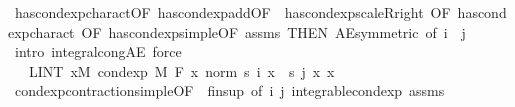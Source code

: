 \begin{isabellebody}
\ has{\isacharunderscore}{\kern0pt}cond{\isacharunderscore}{\kern0pt}exp{\isacharunderscore}{\kern0pt}charact{\isacharparenleft}{\kern0pt}{}{\isacharparenright}{\kern0pt}{\isacharbrackleft}{\kern0pt}OF\ has{\isacharunderscore}{\kern0pt}cond{\isacharunderscore}{\kern0pt}exp{\isacharunderscore}{\kern0pt}add{\isacharbrackleft}{\kern0pt}OF\ {\isacharunderscore}{\kern0pt}\ has{\isacharunderscore}{\kern0pt}cond{\isacharunderscore}{\kern0pt}exp{\isacharunderscore}{\kern0pt}scaleR{\isacharunderscore}{\kern0pt}right{\isacharcomma}{\kern0pt}\ OF\ has{\isacharunderscore}{\kern0pt}cond{\isacharunderscore}{\kern0pt}exp{\isacharunderscore}{\kern0pt}charact{\isacharparenleft}{\kern0pt}{}{\isacharcomma}{\kern0pt}{}{\isacharparenright}{\kern0pt}{\isacharcomma}{\kern0pt}\ OF\ has{\isacharunderscore}{\kern0pt}cond{\isacharunderscore}{\kern0pt}exp{\isacharunderscore}{\kern0pt}simple{\isacharparenleft}{\kern0pt}{}{\isacharcomma}{\kern0pt}{}{\isacharparenright}{\kern0pt}{\isacharbrackleft}{\kern0pt}OF\ assms{\isacharparenleft}{\kern0pt}{}{\isacharcomma}{\kern0pt}{}{\isacharparenright}{\kern0pt}{\isacharbrackright}{\kern0pt}{\isacharbrackright}{\kern0pt}{\isacharcomma}{\kern0pt}\ THEN\ AE{\isacharunderscore}{\kern0pt}symmetric{\isacharcomma}{\kern0pt}\ of\ i\ {\isachardoublequoteopen}{\isacharminus}{\kern0pt}{}{\isachardoublequoteclose}\ j{\isacharbrackright}{\kern0pt}\ \isamarkupfalse%
\ {\isacharparenleft}{\kern0pt}intro\ integral{\isacharunderscore}{\kern0pt}cong{\isacharunderscore}{\kern0pt}AE{\isacharparenright}{\kern0pt}\ force{\isacharplus}{\kern0pt}\ \ \ \ \ \ \isanewline
\ \ \ \ \ \ \isamarkupfalse%
\ \isamarkupfalse%
\ {\isachardoublequoteopen}{\isachardot}{\kern0pt}{\isachardot}{\kern0pt}{\isachardot}{\kern0pt}\ {\isasymle}\ LINT\ x{\isacharbar}{\kern0pt}M{\isachardot}{\kern0pt}\ cond{\isacharunderscore}{\kern0pt}exp\ M\ F\ {\isacharparenleft}{\kern0pt}{\isasymlambda}x{\isachardot}{\kern0pt}\ norm\ {\isacharparenleft}{\kern0pt}s\ i\ x\ {\isacharminus}{\kern0pt}\ s\ j\ x{\isacharparenright}{\kern0pt}{\isacharparenright}{\kern0pt}\ x{\isachardoublequoteclose}\ \isamarkupfalse%
\ cond{\isacharunderscore}{\kern0pt}exp{\isacharunderscore}{\kern0pt}contraction{\isacharunderscore}{\kern0pt}simple{\isacharbrackleft}{\kern0pt}OF\ {\isacharunderscore}{\kern0pt}\ fin{\isacharunderscore}{\kern0pt}sup{\isacharcomma}{\kern0pt}\ of\ i\ j{\isacharbrackright}{\kern0pt}\ integrable{\isacharunderscore}{\kern0pt}cond{\isacharunderscore}{\kern0pt}exp\ assms{\isacharparenleft}{\kern0pt}{}{\isacharparenright}{\kern0pt}\ \isamarkupfalse%

\end{isabellebody}
